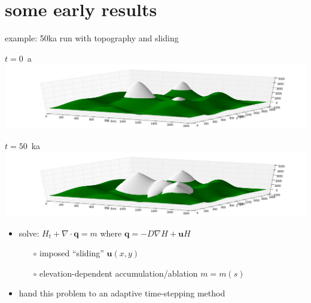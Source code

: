 \documentclass[hide notes,intlimits,usenames,dvipsnames]{beamer}
\newcommand{\Div}{\nabla\cdot}
\newcommand{\grad}{\nabla}
\begin{document}
\section{some early results}

\begin{frame}{example: 50ka run with topography and sliding}
\begin{center}
\mbox{$t=0$ a \includegraphics[height=0.25\textheight]{startsheet.png}}

\mbox{$t=50$ ka \includegraphics[height=0.25\textheight]{endsheet.png}}
\end{center}

\begin{itemize}
\item solve: $H_t + \Div \mathbf{q} = m$ where $\mathbf{q} = -D\grad H + \mathbf{u} H$
    \begin{itemize}
    \item[$\circ$] imposed ``sliding'' $\mathbf{u}(x,y)$
    \item[$\circ$] elevation-dependent accumulation/ablation $m=m(s)$
    \end{itemize}
\item hand this problem to an adaptive time-stepping method
\end{itemize}
\end{frame}
\end{document}
